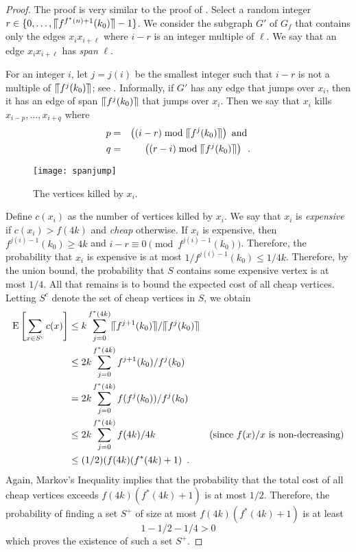 \documentclass{patmorin}
\begin{document}
\begin{proof}
  The proof is very similar to the proof of .  Select a random
  integer $r\in\{0,\ldots,\llceil f^{f^*(n)+1}(k_0)\rrceil-1\}$.  We consider the
  subgraph $G'$ of $G_f$ that contains only the edges $x_ix_{i+\ell}$
  where $i-r$ is an integer multiple of $\ell$.  We say that an edge
  $x_ix_{i+\ell}$ has \emph{span} $\ell$.

  For an integer $i$, let $j=j(i)$ be the smallest integer such that
  $i-r$ is not a multiple of $\llceil f^j(k_0)\rrceil$; see .
  Informally, if $G'$ has any edge that jumps over $x_i$, then it has an
  edge of span $\llceil f^j(k_0)\rrceil$ that jumps over $x_i$.  Then we say that
   $x_i$ kills $x_{i-p},\ldots,x_{i+q}$ where
  \begin{eqnarray*}
     p&=& \left((i-r) \bmod \llceil f^j(k_0)\rrceil\right) \text{ and } \\
     q&=& \left((r-i) \bmod \llceil f^j(k_0)\rrceil\right) \enspace .
  \end{eqnarray*}
  \begin{figure}
    \begin{center}
      \texttt{[image: spanjump]}
    \end{center}
    \caption{The vertices killed by $x_i$.}
  \end{figure}
  
  Define $c(x_i)$ as the number of vertices killed by $x_i$.  We say
  that $x_i$ is \emph{expensive} if $c(x_i) > f(4k)$ and \emph{cheap}
  otherwise.  If $x_i$ is expensive, then $f^{j(i)-1}(k_0)\ge 4k$ and
  $i-r\equiv 0 \pmod {f^{j(i)-1}(k_0)}$.  Therefore, the probability
  that $x_i$ is expensive is at most $1/f^{j(i)-1}(k_0) \le 1/4k$.
  Therefore, by the union bound, the probability that $S$ contains some
  expensive vertex is at most $1/4$.  All that remains is to bound the
  expected cost of all cheap vertices. Letting $S^c$ denote the set of
  cheap vertices in $S$, we obtain
  \begin{align*}
     \mathrm{E}\left[\sum_{x\in S^c} c(x)\right] 
      & \le  k \sum_{j=0}^{f^*(4k)} \llceil f^{j+1}(k_0)\rrceil/\llceil f^j(k_0)\rrceil \\
      & \le  2k \sum_{j=0}^{f^*(4k)} f^{j+1}(k_0)/f^j(k_0) \\
      & =  2k \sum_{j=0}^{f^*(4k)} f(f^{j}(k_0))/f^j(k_0) \\
      & \le  2k \sum_{j=0}^{f^*(4k)} f(4k)/4k 
           & \text{(since $f(x)/x$ is non-decreasing)} \\
      & \le  (1/2)(f(4k)(f^*(4k)+1) \enspace .
  \end{align*}
  Again, Markov's Inequality implies that the probability that the total
  cost of all cheap vertices exceeds $f(4k)(f^*(4k)+1)$ is at most $1/2$.
  Therefore, the probability of finding a set $S^+$ of size at most
  $f(4k)(f^*(4k)+1)$ is at least
  \[  
     1 - 1/2 - 1/4 > 0 
  \]
  which proves the existence of such a set $S^+$.
  

\end{proof}
\end{document}
